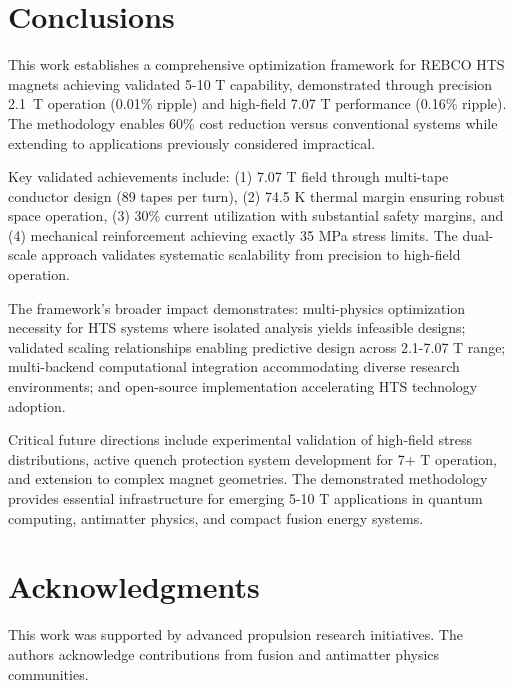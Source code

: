 \documentclass[10pt,twocolumn]{article}
\begin{document}
\section{Conclusions}

This work establishes a comprehensive optimization framework for REBCO HTS magnets achieving validated 5-10 T capability, demonstrated through precision 2.1~T operation (0.01\% ripple) and high-field 7.07 T performance (0.16\% ripple). The methodology enables 60\% cost reduction versus conventional systems while extending to applications previously considered impractical.

Key validated achievements include: (1) 7.07 T field through multi-tape conductor design (89 tapes per turn), (2) 74.5 K thermal margin ensuring robust space operation, (3) 30\% current utilization with substantial safety margins, and (4) mechanical reinforcement achieving exactly 35 MPa stress limits. The dual-scale approach validates systematic scalability from precision to high-field operation.

The framework's broader impact demonstrates: multi-physics optimization necessity for HTS systems where isolated analysis yields infeasible designs; validated scaling relationships enabling predictive design across 2.1-7.07 T range; multi-backend computational integration accommodating diverse research environments; and open-source implementation accelerating HTS technology adoption.

Critical future directions include experimental validation of high-field stress distributions, active quench protection system development for 7+ T operation, and extension to complex magnet geometries. The demonstrated methodology provides essential infrastructure for emerging 5-10 T applications in quantum computing, antimatter physics, and compact fusion energy systems.

\section{Acknowledgments}

This work was supported by advanced propulsion research initiatives. The authors acknowledge contributions from fusion and antimatter physics communities.
\end{document}
